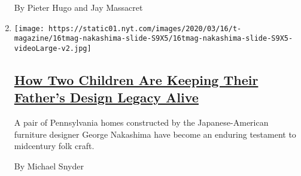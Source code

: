 \begin{enumerate}
  By Pieter Hugo and Jay Massacret
\item
  \texttt{[image: https://static01.nyt.com/images/2020/03/16/t-magazine/16tmag-nakashima-slide-S9X5/16tmag-nakashima-slide-S9X5-videoLarge-v2.jpg]}

  \hypertarget{how-two-children-are-keeping-their-fathers-design-legacy-alive}{%
  \subsection{\texorpdfstring{\href{/2020/03/16/t-magazine/george-nakashima-legacy.html}{How
  Two Children Are Keeping Their Father's Design Legacy
  Alive}}{How Two Children Are Keeping Their Father's Design Legacy Alive}}\label{how-two-children-are-keeping-their-fathers-design-legacy-alive}}

  A pair of Pennsylvania homes constructed by the Japanese-American
  furniture designer George Nakashima have become an enduring testament
  to midcentury folk craft.

  By Michael Snyder
\end{enumerate}

